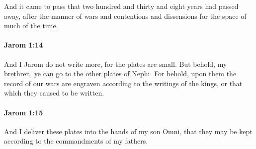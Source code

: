 			And it came to pass that two hundred and thirty and eight years had passed away,
			after the manner of wars and contentions and dissensions
			for the space of much of the time.

		\paragraph{Jarom 1:14} %
			\label{JAROM-1-14}

			And I Jarom do not write more,
			for the plates are small.
			But behold, my brethren, ye can go to the other plates of Nephi.
			For behold, upon them the record of our wars are engraven
			according to the writings of the kings,
			or that which they caused to be written.

		\paragraph{Jarom 1:15} %
			\label{JAROM-1-15}

			And I deliver these plates into the hands of my son Omni,
			that they may be kept according to the commandments of my fathers.